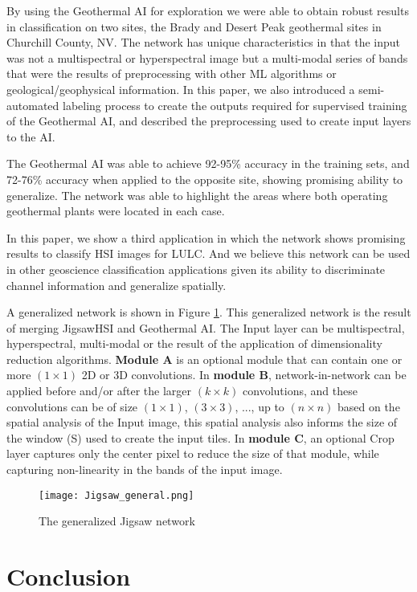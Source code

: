 \documentclass[lettersize, journal]{IEEEtran}
\begin{document}
By using the Geothermal AI for exploration we were able to obtain robust results in classification on two sites, the Brady and Desert Peak geothermal sites in Churchill County, NV. The network has unique characteristics in that the input was not a multispectral or hyperspectral image but a multi-modal series of bands that were the results of preprocessing with other ML algorithms or geological/geophysical information. In this paper, we also introduced a semi-automated labeling process to create the outputs required for supervised training of the Geothermal AI, and described the preprocessing used to create input layers to the AI.

The Geothermal AI was able to achieve 92-95\% accuracy in the training sets, and 72-76\% accuracy when applied to the opposite site, showing promising ability to generalize. The network was able to highlight the areas where both operating geothermal plants were located in each case.

In this paper, we show a third application in which the network shows promising results to classify HSI images for LULC. And we believe this network can be used in other geoscience classification applications given its ability to discriminate channel information and generalize spatially.

A generalized network is shown in Figure \ref{fig:Jigsaw_general}. This generalized network is the result of merging JigsawHSI and Geothermal AI. The Input layer can be multispectral, hyperspectral, multi-modal or the result of the application of dimensionality reduction algorithms. \textbf{Module A} is an optional module that can contain one or more $(1 \times 1)$ 2D or 3D convolutions. In \textbf{module B}, network-in-network can be applied before and/or after the larger $(k \times k)$ convolutions, and these convolutions can be of size $(1 \times 1)$, $(3 \times 3)$, ..., up to $(n \times n)$ based on the spatial analysis of the Input image, this spatial analysis also informs the size of the window (S) used to create the input tiles.
In \textbf{module C}, an optional Crop layer captures only the center pixel to reduce the size of that module, while capturing non-linearity in the bands of the input image.


\begin{figure}[!htb]
    \centering
    \texttt{[image: Jigsaw\_general.png]}
    \caption{The generalized Jigsaw network}
    \label{fig:Jigsaw_general}
\end{figure}


\section{Conclusion}
\end{document}
